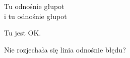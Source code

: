\documentclass{article}
\begin{document}
Tu odnośnie głupot\\i tu odnośnie głupot %


Tu jest OK.

Nie rozjechała się linia odnośnie błędu? %
\end{document}

